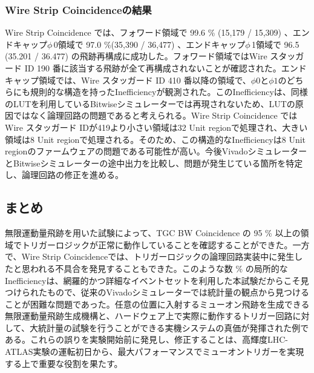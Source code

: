 \subsubsection*{Wire Strip Coincidenceの結果}
Wire Strip Coincidence では、フォワード領域で 99.6 \% (15,179 / 15,309) 、エンドキャップ$\phi\,$0領域で 97.0 \%(35,390 / 36,477) 、エンドキャップ$\phi\,$1領域で 96.5 (35.201 / 36.477) の飛跡再構成に成功した。フォワード領域ではWire スタッガード ID 190 番に該当する飛跡が全て再構成されないことが確認された。エンドキャップ領域では、Wire スタッガード ID 410 番以降の領域で、$\phi0$と$\phi1$のどちらにも規則的な構造を持ったInefficiencyが観測された。このInefficiencyは、同様のLUTを利用しているBitwiseシミュレーターでは再現されないため、LUTの原因ではなく論理回路の問題であると考えられる。Wire Strip Coincidence ではWire スタッガード IDが419より小さい領域は32 Unit regionで処理され、大きい領域は8 Unit regionで処理される。そのため、この構造的なInefficiencyは8 Unit regionのファームウェアの問題である可能性が高い。今後VivadoシミュレーターとBitwiseシミュレーターの途中出力を比較し、問題が発生じている箇所を特定し、論理回路の修正を進める。

\subsection{まとめ}
無限運動量飛跡を用いた試験によって、TGC BW Coincidence の 95 \% 以上の領域でトリガーロジックが正常に動作していることを確認することができた。一方で、Wire Strip Coincidenceでは、トリガーロジックの論理回路実装中に発生したと思われる不具合を発見することもできた。このような数 \% の局所的なInefficiencyは、網羅的かつ詳細なイベントセットを利用した本試験だからこそ見つけられたもので、従来のVivadoシミュレーターでは統計量の観点から見つけることが困難な問題であった。任意の位置に入射するミューオン飛跡を生成できる無限運動量飛跡生成機構と、ハードウェア上で実際に動作するトリガー回路に対して、大統計量の試験を行うことができる実機システムの真価が発揮された例である。これらの誤りを実験開始前に発見し、修正することは、高輝度LHC-ATLAS実験の運転初日から、最大パフォーマンスでミューオントリガーを実現する上で重要な役割を果たす。

